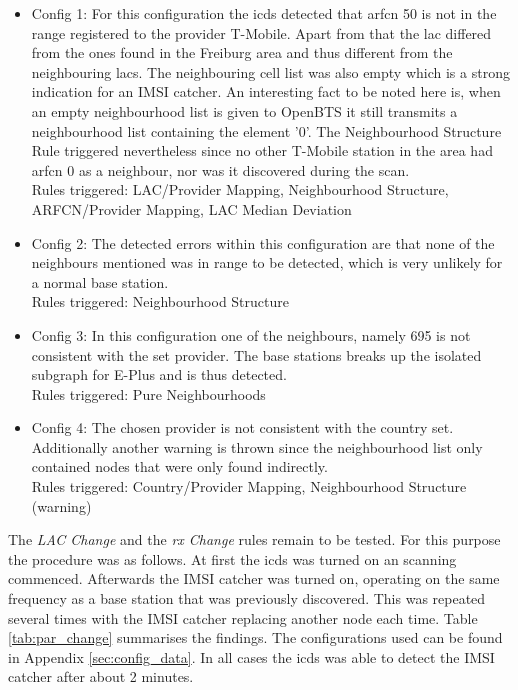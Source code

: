 \begin{itemize}
	\item Config 1: For this configuration the \gls{icds} detected that \gls{arfcn} 50 is not in the range registered to the provider T-Mobile.
	Apart from that the \gls{lac} differed from the ones found in the Freiburg area and thus different from the neighbouring \glspl{lac}.
	The neighbouring cell list was also empty which is a strong indication for an IMSI catcher. 
	An interesting fact to be noted here is, when an empty neighbourhood list is given to OpenBTS it still transmits a neighbourhood list containing the element '0'.
	The Neighbourhood Structure Rule triggered nevertheless since no other T-Mobile station in the area had \gls{arfcn} 0 as a neighbour, nor was it discovered during the scan.\\
	Rules triggered: LAC/Provider Mapping, Neighbourhood Structure, ARFCN/Provider Mapping, LAC Median Deviation
	\item Config 2: The detected errors within this configuration are that none of the neighbours mentioned was in range to be detected, which is very unlikely for a normal base station.\\
	Rules triggered: Neighbourhood Structure
	\item Config 3: In this configuration one of the neighbours, namely 695 is not consistent with the set provider.
	The base stations breaks up the isolated subgraph for E-Plus and is thus detected.\\
	Rules triggered: Pure Neighbourhoods
	\item Config 4:	The chosen provider is not consistent with the country set.
	Additionally another warning is thrown since the neighbourhood list only contained nodes that were only found indirectly.\\
	Rules triggered: Country/Provider Mapping, Neighbourhood Structure (warning) 
\end{itemize}
The \emph{LAC Change} and the \emph{rx Change} rules remain to be tested.
For this purpose the procedure was as follows.
At first the \gls{icds} was turned on an scanning commenced.
Afterwards the IMSI catcher was turned on, operating on the same frequency as a base station that was previously discovered.
This was repeated several times with the IMSI catcher replacing another node each time.
Table \ref{tab:par_change} summarises the findings.
The configurations used can be found in Appendix \ref{sec:config_data}.
In all cases the \gls{icds} was able to detect the IMSI catcher after about 2 minutes.
